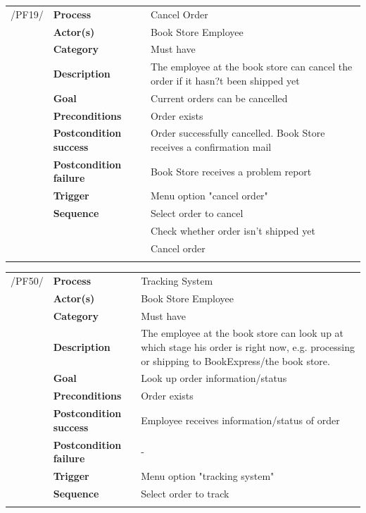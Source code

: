\documentclass[11pt,a4paper,oneside,svgnames]{report}
\begin{document}
\noindent
\begin{tabular}{p{1.5cm}p{3cm}p{8cm}}
\cellcolor{white}/PF19/	& \textbf{Process} & Cancel Order\\
\cellcolor{white}		& \textbf{Actor(s)} & Book Store Employee\\
\cellcolor{white}		& \textbf{Category} & Must have\\
\cellcolor{white}		& \textbf{Description}	 & The employee at the book store can cancel the order if it hasn?t been shipped yet\\
\cellcolor{white}		& \textbf{Goal} & Current orders can be cancelled\\
\cellcolor{white}		& \textbf{Preconditions} & Order exists\\
\cellcolor{white}		& \textbf{Postcondition success} & Order successfully cancelled. Book Store receives a confirmation mail\\
\cellcolor{white}		& \textbf{Postcondition failure} & Book Store receives a problem report\\
\cellcolor{white}		& \textbf{Trigger} & Menu option "cancel order"\\
\cellcolor{white}		& \textbf{Sequence} & Select order to cancel\\
\cellcolor{white}		& & Check whether order isn't shipped yet\\
\cellcolor{white}		& & Cancel order\\
\cellcolor{white}\hfill \\
\end{tabular}

\noindent
\begin{tabular}{p{1.5cm}p{3cm}p{8cm}}
\cellcolor{white}/PF50/	& \textbf{Process} & Tracking System\\
\cellcolor{white}		& \textbf{Actor(s)} & Book Store Employee\\
\cellcolor{white}		& \textbf{Category} & Must have\\
\cellcolor{white}		& \textbf{Description}	 & The employee at the book store can look up at which stage his order is right now, e.g. processing or shipping to BookExpress/the book store.\\
\cellcolor{white}		& \textbf{Goal} & Look up order information/status\\
\cellcolor{white}		& \textbf{Preconditions} & Order exists\\
\cellcolor{white}		& \textbf{Postcondition success} & Employee receives information/status of order\\
\cellcolor{white}		& \textbf{Postcondition failure} & -\\
\cellcolor{white}		& \textbf{Trigger} & Menu option "tracking system"\\
\cellcolor{white}		& \textbf{Sequence} & Select order to track\\
\cellcolor{white}\hfill \\
\end{tabular}
\end{document}
